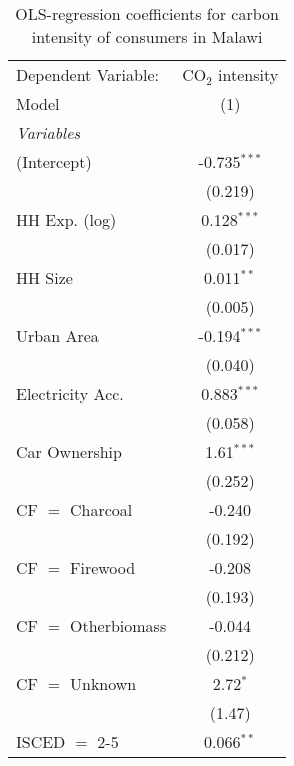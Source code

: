 
\begin{table}[htbp!]
   \centering
   \small
   \begin{adjustbox}{width = 1\textwidth, max height = 0.95\textheight, center}
      \begin{threeparttable}[b]
         \caption{\label{tab:OLS_1_MWI} OLS-regression coefficients for carbon intensity of consumers in Malawi}
         \begin{tabular}{lc}
            \tabularnewline \midrule \midrule
            Dependent Variable: & CO$_{2}$ intensity\\  
            Model               & (1)\\  
            \midrule
            \emph{Variables}\\
            (Intercept)         & -0.735$^{***}$\\   
                                & (0.219)\\   
            HH Exp. (log)       & 0.128$^{***}$\\   
                                & (0.017)\\   
            HH Size             & 0.011$^{**}$\\   
                                & (0.005)\\   
            Urban Area          & -0.194$^{***}$\\   
                                & (0.040)\\   
            Electricity Acc.    & 0.883$^{***}$\\   
                                & (0.058)\\   
            Car Ownership       & 1.61$^{***}$\\   
                                & (0.252)\\   
            CF $=$ Charcoal     & -0.240\\   
                                & (0.192)\\   
            CF $=$ Firewood     & -0.208\\   
                                & (0.193)\\   
            CF $=$ Otherbiomass & -0.044\\   
                                & (0.212)\\   
            CF $=$ Unknown      & 2.72$^{*}$\\   
                                & (1.47)\\   
            ISCED $=$ 2-5       & 0.066$^{**}$\\   

\end{tabular}
\end{threeparttable}
\end{adjustbox}
\end{table}
